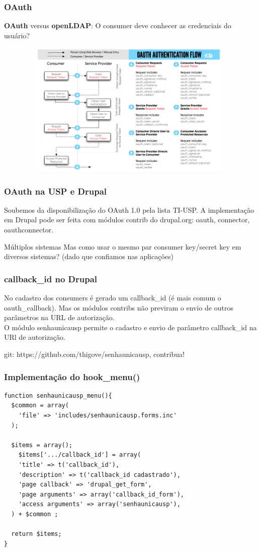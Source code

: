 \begin{frame}\frametitle{OAuth}
\textbf{OAuth} versus \textbf{openLDAP}: O consumer deve conhecer as credenciais do usuário?
\begin{figure}
  \includegraphics[width=11cm,height=6.5cm]{images/diagram.png}
\end{figure}
\end{frame}

\begin{frame}\frametitle{OAuth na USP e Drupal}
Soubemos da disponibilização do OAuth 1.0 pela lista TI-USP. A implementação em Drupal pode ser feita com módulos contrib do drupal.org: oauth, connector, oauthconnector.  
\begin{block}{Múltiplos sistemas}
Mas como usar o mesmo par consumer key/secret key em diversos sistemas? (dado que confiamos nas aplicações)
\end{block}
\end{frame}


\begin{frame}\frametitle{callback\_id no Drupal}
No cadastro dos consumers é gerado um callback\_id (é mais comum o oauth\_callback). Mas os módulos contribs não previram o envio de outros parâmetros na URL de autorização. \\
O módulo senhaunicausp permite o cadastro e envio de parâmetro callback\_id na URl de autorização.   

git: https://github.com/thigove/senhaunicausp, contribua!
\end{frame}

\begin{frame}[fragile]\frametitle{Implementação do hook\_menu()}
\begin{lstlisting}
function senhaunicausp_menu(){
  $common = array(
    'file' => 'includes/senhaunicausp.forms.inc'
  );

  $items = array();
    $items['.../callback_id'] = array(
    'title' => t('callback_id'),
    'description' => t('callback_id cadastrado'),
    'page callback' => 'drupal_get_form',
    'page arguments' => array('callback_id_form'),
    'access arguments' => array('senhaunicausp'),
  ) + $common ;

  return $items;	
}
\end{lstlisting}
\end{frame}

